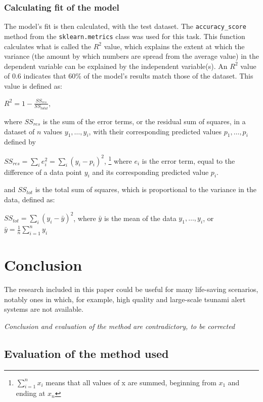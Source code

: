 \documentclass[11pt,letterpaper]{article}
\begin{document}
\subsubsection{Calculating fit of the model}

The model's fit is then calculated, with the test dataset. The \verb|accuracy_score| method
from the \verb|sklearn.metrics| class was used for this task. This function calculates what
is called the $R^2$ value, which explains the extent at which the variance (the amount by which numbers
are spread from the average value) in the dependent variable can be explained by the independent
variable(s). An $R^2$ value of 0.6 indicates that 60\% of the model's results match those of the
dataset. This value is defined as:

$R^2 = 1 - \frac{SS_{res}}{SS_{total}}$,

where $SS_{res}$ is the sum of the error terms, or the residual sum of squares, in a dataset of $n$
values $y_1,\dots, y_i$, with their corresponding predicted values $p_1,\dots, p_i$ defined by

$SS_{res} = \sum\limits_{i} e_i^2 = \sum\limits_{i} (y_i - p_i)^2$, \footnote{$\sum\limits_{i=1}^n x_i$ means that all values of
    x are summed, beginning from $x_1$ and ending at $x_n$} where $e_i$ is the error term, equal to the difference of a data point $y_i$
and its corresponding predicted value $p_i$.

and $SS_{tot}$ is the total sum of squares, which is proportional to the variance in the data,
defined as:

$SS_{tot} = \sum\limits_{i} (y_i - \bar y)^2$, where $\bar y$ is the mean of the data $y_1,\dots, y_i$,
or $\bar y = \frac{1}{n} \sum\limits_{i=1}^n y_i$



\section{Conclusion}

The research included in this paper could be useful for many life-saving scenarios,
notably ones in which, for example, high quality and large-scale tsunami alert
systems are not available.

\textit{Conclusion and evaluation of the method are contradictory, to be corrected}

\subsection{Evaluation of the method used}
\end{document}
